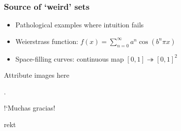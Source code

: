 \documentclass[12pt]{beamer}
\begin{document}
\begin{frame}
\frametitle{Source of `weird' sets}
\begin{itemize}[<+->]
	\item Pathological examples where intuition fails
	\item \alert{Weierstrass function:} $f(x) = \sum_{n=0}^\infty a^n \cos(b^n\pi x)$
	\item \alert{Space-filling curves:} continuous map $[0, 1] \twoheadrightarrow [0,1]^2$	
\end{itemize}

%
\end{frame}

\begin{frame}
 	Attribute images here
\end{frame}

\begin{frame}[standout]
	\phantom.
	\vspace{3cm}

	\Huge !`\hspace{0.1em}Muchas gracias\hspace{0.1em}!
	
	\vspace{3cm}
	\hfill\scriptsize{\textcolor{white!50!black}{rekt}}
\end{frame}
\end{document}
